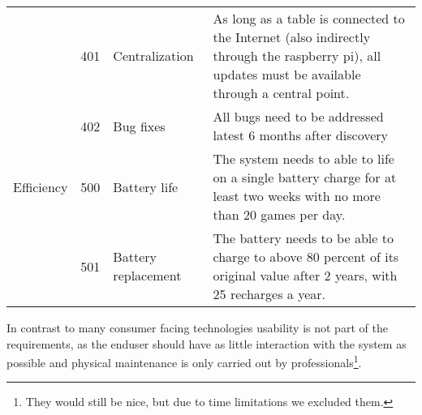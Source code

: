 \begin{table}[]
\begin{tabular}{ l l p{2.5cm} p{7.1cm}}
                        & 401 & Centralization        & As long as a table is connected to the Internet (also indirectly through the raspberry pi), all updates must be available through a central point. \\
                        & 402 & Bug fixes             & All bugs need to be addressed latest 6 months after discovery                                                                                      \\
        Efficiency      & 500 & Battery life          & The system needs to able to life on a single battery charge for at least two weeks with no more than 20 games per day.                             \\
                        & 501 & Battery replacement   & The battery needs to be able to charge to above 80 percent of its original value after 2 years, with 25 recharges a year.                         
        \end{tabular}\label{tab:nonfuncReq}
        \end{table}
In contrast to many consumer facing technologies usability is not part of the requirements, as the enduser should have as little interaction with the system as possible and physical maintenance is only carried out by professionals\footnote{They would still be nice, but due to time limitations we excluded them.}.\\
